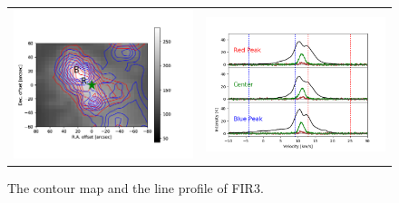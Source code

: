\begin{figure}[h!]
	\begin{center}
		\begin{tabular}{cc}
			\includegraphics[width=7cm]{Orion_12CO2-1_FIR3_rbcontour_400_modified.png} &   \includegraphics[width=7cm]{Orion_12CO2-1_FIR3_line_profile_400.png}\\
		\end{tabular}
		\label{FIR321}
		\caption{The contour map and the line profile of FIR3. }
	\end{center}
\end{figure}

